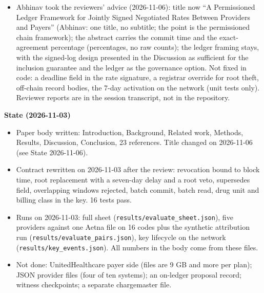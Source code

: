 \begin{itemize}
\item Abhinav took the reviewers' advice (2026-11-06): title now ``A Permissioned Ledger Framework for Jointly Signed Negotiated Rates Between Providers and Payers'' (Abhinav: one title, no subtitle; the point is the permissioned chain framework); the abstract carries the commit time and the exact-agreement percentage (percentages, no raw counts); the ledger framing stays, with the signed-log design presented in the Discussion as sufficient for the inclusion guarantee and the ledger as the governance option. Not fixed in code: a deadline field in the rate signature, a registrar override for root theft, off-chain record bodies, the 7-day activation on the network (unit tests only). Reviewer reports are in the session transcript, not in the repository.
\end{itemize}

\textbf{State (2026-11-03)}
\begin{itemize}
\item Paper body written: Introduction, Background, Related work, Methods, Results, Discussion, Conclusion, 23 references. Title changed on 2026-11-06 (see State 2026-11-06).
\item Contract rewritten on 2026-11-03 after the review: revocation bound to block time, root replacement with a seven-day delay and a root veto, supersedes field, overlapping windows rejected, batch commit, batch read, drug unit and billing class in the key. 16 tests pass.
\item Runs on 2026-11-03: full sheet (\texttt{results/evaluate\_sheet.json}), five providers against one Aetna file on 16 codes plus the synthetic attribution run (\texttt{results/evaluate\_pairs.json}), key lifecycle on the network (\texttt{results/key\_events.json}). All numbers in the body come from these files.
\item Not done: UnitedHealthcare payer side (files are 9 GB and more per plan); JSON provider files (four of ten systems); an on-ledger proposal record; witness checkpoints; a separate chargemaster file.
\end{itemize}

